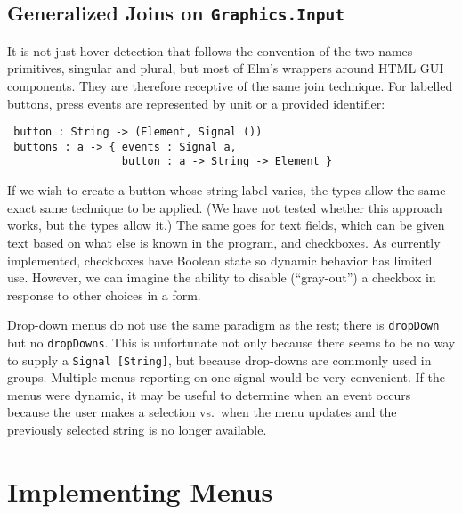 \documentclass{article}
\begin{document}
\subsection{Generalized Joins on \texttt{Graphics.Input}}

It is not just hover detection that follows the convention of the two
names primitives, singular and plural, but most of Elm's wrappers around
HTML GUI components. They are therefore receptive of the same join
technique. For labelled buttons, press events are represented by unit or
a provided identifier:

\begin{verbatim}
 button : String -> (Element, Signal ())
 buttons : a -> { events : Signal a,
                  button : a -> String -> Element }
\end{verbatim}

If we wish to create a button whose string label varies, the types allow
the same exact same technique to be applied. (We have not tested whether
this approach works, but the types allow it.) The same goes for text
fields, which can be given text based on what else is known in the
program, and checkboxes. As currently implemented, checkboxes have
Boolean state so dynamic behavior has limited use. However, we can
imagine the ability to disable (``gray-out'') a checkbox in response to
other choices in a form.

Drop-down menus do not use the same paradigm as the rest; there is
\texttt{dropDown} but no \texttt{dropDowns}. This is unfortunate not
only because there seems to be no way to supply a
\texttt{Signal {[}String{]}}, but because drop-downs are commonly used
in groups. Multiple menus reporting on one signal would be very
convenient. If the menus were dynamic, it may be useful to determine
when an event occurs because the user makes a selection vs.~when the
menu updates and the previously selected string is no longer available.

%
%

\section{Implementing Menus}\label{implementing-menus}
\end{document}
